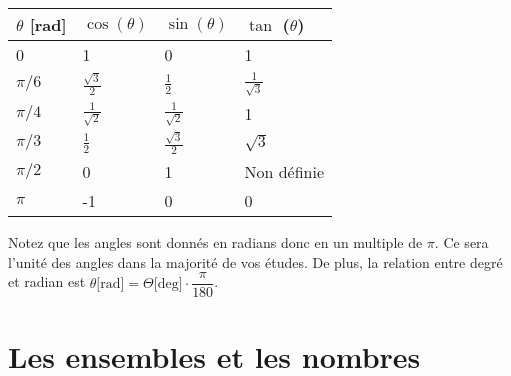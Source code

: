 \documentclass[oneside,12pt,french,table]{book}
\theoremstyle{definition}
\theoremstyle{plain}
\theoremstyle{remark}
\begin{document}
\begin{center}
\begin{tabular}{|m{1.5cm} |m{2cm}| m{2cm}|m{2cm}|} 
 \hline
    $\theta$ [rad] & $\cos (\theta)$& $\sin (\theta)$& $\tan$ ($\theta$)\\
    \hline
    0& 1& 0&1\\
    $\pi/6$ & $\frac{\sqrt{3}}{2}$ &$\frac{1}{2}$&$\frac{1}{\sqrt{3}}$\\ 
    $\pi/4$ &$\frac{1}{\sqrt{2}}$&$\frac{1}{\sqrt{2}}$&1\\
    $\pi/3$ &$\frac{1}{2}$& $\frac{\sqrt{3}}{2}$&$\sqrt{3}$\\
    $\pi/2$ &0&1& Non définie\\
    $\pi$&-1&0&0\\
 \hline
 \end{tabular}
\end{center}
Notez que les angles sont donnés en radians donc en un multiple de $\pi$. Ce sera l'unité des angles dans la majorité de vos études. De plus, la relation entre degré et radian est $\theta \text{[rad]}= \Theta\text{[deg]}\cdot \dfrac{\pi}{180}$.


\chapter{Les ensembles et les nombres}
\end{document}

